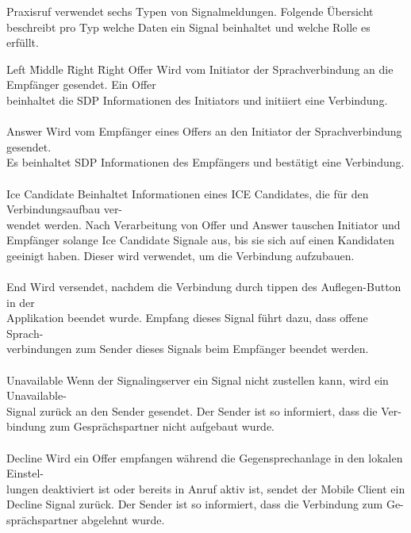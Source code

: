 Praxisruf verwendet sechs Typen von Signalmeldungen.
Folgende Übersicht beschreibt pro Typ welche Daten ein Signal beinhaltet und welche Rolle es erfüllt.
\\
\begin{tabbing}
    Left \= Middle \= Right \= Right \kill
    Offer
    \> \> \> Wird vom Initiator der Sprachverbindung an die Empfänger gesendet. Ein Offer
    \\\> \> \> beinhaltet die SDP Informationen des Initiators und initiiert eine Verbindung. \\ \\

    Answer
    \> \> \> Wird vom Empfänger eines Offers an den Initiator der Sprachverbindung gesendet.
    \\\> \> \> Es beinhaltet SDP Informationen des Empfängers und bestätigt eine Verbindung. \\ \\

    Ice Candidate
    \> \> \> Beinhaltet Informationen eines ICE Candidates, die für den Verbindungsaufbau ver-
    \\ \> \> \> wendet werden. Nach Verarbeitung von Offer und Answer tauschen Initiator und
    \\ \> \> \> Empfänger solange Ice Candidate Signale aus, bis sie sich auf einen Kandidaten
    \\ \> \> \> geeinigt haben. Dieser wird verwendet, um die Verbindung aufzubauen.
    \\ \> \> \> \\

    End
    \> \> \> Wird versendet, nachdem die Verbindung durch tippen des Auflegen-Button in der
    \\ \> \> \> Applikation beendet wurde. Empfang dieses Signal führt dazu, dass offene Sprach-
    \\ \> \> \> verbindungen zum Sender dieses Signals beim Empfänger beendet werden.\\ \\

    Unavailable
    \> \> \> Wenn der Signalingserver ein Signal nicht zustellen kann, wird ein Unavailable-
    \\ \> \> \> Signal zurück an den Sender gesendet. Der Sender ist so informiert, dass die Ver-
    \\ \> \> \> bindung zum Gesprächspartner nicht aufgebaut wurde. \\ \\

    Decline
    \> \> \> Wird ein Offer empfangen während die Gegensprechanlage in den lokalen Einstel-
    \\ \> \> \> lungen deaktiviert ist oder bereits in Anruf aktiv ist, sendet der Mobile Client ein
    \\ \> \> \> Decline Signal zurück. Der Sender ist so informiert, dass die Verbindung zum Ge-
    \\ \> \> \> sprächspartner abgelehnt wurde.
\end{tabbing}

